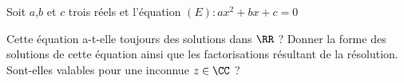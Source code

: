 %
%
	Soit $a$,$b$ et $c$ trois réels et  l'équation $(E) : ax^2+bx+c=0$
	\begin{tasks}
		\task Cette équation a-t-elle toujours des solutions dans $\RR$ ?
		\task Donner la forme des solutions de cette équation ainsi que les factorisations résultant de la résolution. Sont-elles valables pour une inconnue $z \in \CC$ ?
	\end{tasks}
